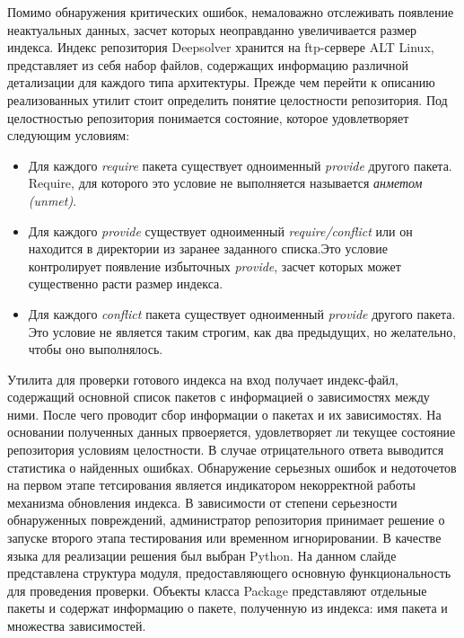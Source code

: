 \documentclass[a4paper]{article}
\begin{document}
Помимо обнаружения критических ошибок, немаловажно отслеживать появление 
неактуальных данных, засчет которых неоправданно увеличивается размер индекса. %
\newpage
Индекс репозитория Deepsolver хранится на ftp-сервере ALT Linux, представляет
из себя набор файлов, содержащих информацию различной детализации
для каждого типа архитектуры.
\newpage
Прежде чем перейти к описанию реализованных утилит стоит
определить понятие целостности репозитория. Под целостностью
репозитория понимается состояние, которое удовлетворяет следующим
условиям:
\begin{itemize}
\item{Для каждого \textit{require} пакета существует одноименный \textit{provide} 
другого пакета. Require, для которого это условие не выполняется
называется \textit{анметом (unmet)}. }
\item{Для каждого \textit{provide} существует одноименный \textit{require/conflict} или
он находится в директории из заранее заданного списка.Это условие 
контролирует появление избыточных \textit{provide}, засчет которых
может существенно расти размер индекса.}
\item{Для каждого \textit{conflict} пакета существует одноименный \textit{provide} 
другого пакета. Это условие не является таким строгим, как два предыдущих,
но желательно, чтобы оно выполнялось. }
\end{itemize}
\newpage
Утилита для проверки готового индекса на вход получает индекс-файл, содержащий основной
список пакетов с информацией о 
зависимостях между ними. После чего проводит сбор информации о пакетах и их зависимостях. 
На основании полученных данных првоеряется, удовлетворяет ли текущее состояние 
репозитория условиям целостности. В случае отрицательного ответа выводится 
статистика о найденных ошибках. Обнаружение серьезных ошибок и недоточетов 
на первом этапе тетсирования является индикатором некорректной работы 
механизма обновления индекса. В зависимости от степени серьезности обнаруженных
повреждений, администратор репозитория принимает решение о запуске второго этапа 
тестирования или временном игнорировании.
\newpage
В качестве языка для реализации решения был выбран Python. На данном слайде 
представлена структура модуля, предоставляющего основную функциональность 
для проведения проверки. Объекты класса Package представляют отдельные пакеты 
и содержат информацию о пакете, полученную из индекса: имя пакета и множества 
зависимостей.
\end{document}
